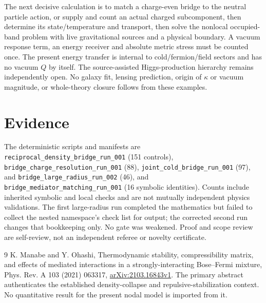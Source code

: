 \documentclass[11pt]{article}
\begin{document}
The next decisive calculation is to match a charge-even bridge to the
neutral particle action, or supply and count an actual charged subcomponent,
then determine its state/temperature and transport,
then solve the nonlocal occupied-band problem with live gravitational
sources and a physical boundary. A vacuum response term, an energy receiver
and absolute metric stress must be counted once. The present energy transfer
is internal to cold/fermion/field sectors and has no vacuum $Q$ by itself.
The source-assisted Higgs-production hierarchy remains independently open.
No galaxy fit, lensing prediction, origin of $\kappa$ or vacuum magnitude,
or whole-theory closure follows from these examples.

\section{Evidence}
The deterministic scripts and manifests are
\texttt{reciprocal\_density\_bridge\_run\_001} (151 controls),
\texttt{bridge\_charge\_resolution\_run\_001} (88),
\texttt{joint\_cold\_bridge\_run\_001} (97), and
\texttt{bridge\_large\_radius\_run\_002} (46), and
\texttt{bridge\_mediator\_matching\_run\_001} (16 symbolic identities).
Counts include inherited symbolic and local checks and are not mutually
independent physics validations. The first large-radius run completed the
mathematics but failed to collect the nested namespace's check list for
output; the corrected second run changes that bookkeeping only. No gate
was weakened. Proof and scope review are self-review, not an independent
referee or novelty certificate.

\begin{thebibliography}{9}
 K. Manabe and Y. Ohashi,
Thermodynamic stability, compressibility matrix, and effects of mediated
interactions in a strongly-interacting Bose--Fermi mixture,
Phys. Rev. A 103 (2021) 063317,
\href{https://arxiv.org/abs/2103.16843v1}{arXiv:2103.16843v1}.
The primary abstract authenticates the established density-collapse and
repulsive-stabilization context. No quantitative result for the present
nodal model is imported from it.
\end{thebibliography}
\end{document}
